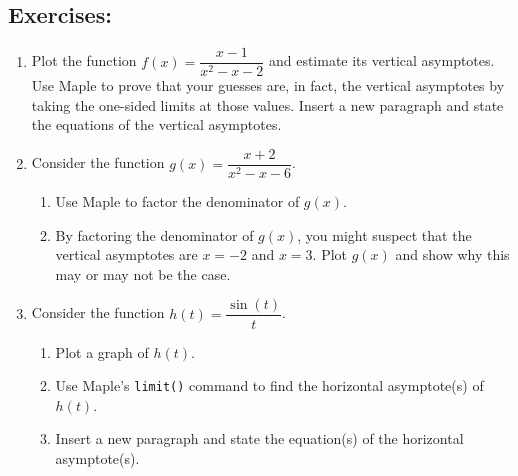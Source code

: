 \subsection*{Exercises:}
\begin{enumerate} 
    \item Plot the function $f(x)=\dfrac{x-1}{x^2-x-2}$ and estimate its vertical asymptotes. Use Maple to prove that your guesses are, in fact, the vertical asymptotes by taking the one-sided limits at those values. Insert a new paragraph and state the equations of the vertical asymptotes.

    \item Consider the function $g(x)=\dfrac{x+2}{x^2-x-6}$.
    \begin{enumerate}
    \item Use Maple to factor the denominator of $g(x)$.
    \item By factoring the denominator of $g(x)$, you might suspect that the vertical asymptotes are $x=-2$ and $x=3$. Plot $g(x)$ and show why this may or may not be the case.
    \end{enumerate}
    

    \item Consider the function $h(t)=\dfrac{\sin(t)}{t}$.
    \begin{enumerate}
        \item Plot a graph of $h(t)$.
        \item Use Maple's \texttt{limit()} command to find the horizontal asymptote(s) of $h(t)$. 
        \item Insert a new paragraph and state the equation(s) of the horizontal asymptote(s).
      \end{enumerate}



\end{enumerate}

